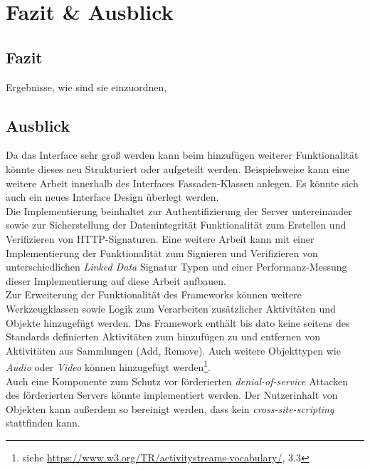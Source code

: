 \chapter{Fazit \& Ausblick}
\section{Fazit}
Ergebnisse, wie sind sie einzuordnen, 
\section{Ausblick}
\label{ch:Conclusion}
Da das Interface sehr groß werden kann beim hinzufügen weiterer Funktionalität könnte dieses neu Strukturiert oder aufgeteilt werden. Beispielsweise kann eine weitere Arbeit innerhalb des Interfaces Fassaden-Klassen anlegen. Es könnte sich auch ein neues Interface Design überlegt werden.\\

Die Implementierung beinhaltet zur Authentifizierung der Server untereinander sowie zur Sicherstellung der Datenintegrität Funktionalität zum Erstellen und Verifizieren von HTTP-Signaturen. Eine weitere Arbeit kann mit einer Implementierung der Funktionalität zum Signieren und Verifizieren von unterschiedlichen \textit{Linked Data} Signatur Typen und einer Performanz-Messung dieser Implementierung auf diese Arbeit aufbauen.\\

Zur Erweiterung der Funktionalität des Frameworks können weitere Werkzeugklassen sowie Logik zum Verarbeiten zusätzlicher Aktivitäten und Objekte hinzugefügt werden. Das Framework enthält bis dato keine seitens des Standards definierten Aktivitäten zum hinzufügen zu und entfernen von Aktivitäten aus Sammlungen (Add, Remove). Auch weitere Objekttypen wie \textit{Audio} oder \textit{Video} können hinzugefügt werden\footnote{siehe \url{https://www.w3.org/TR/activitystreams-vocabulary/}, 3.3}.\\

Auch eine Komponente zum Schutz vor förderierten \textit{denial-of-service} Attacken des förderierten Servers könnte implementiert werden. Der Nutzerinhalt von Objekten kann außerdem so bereinigt werden, dass kein \textit{cross-site-scripting} stattfinden kann.\\

